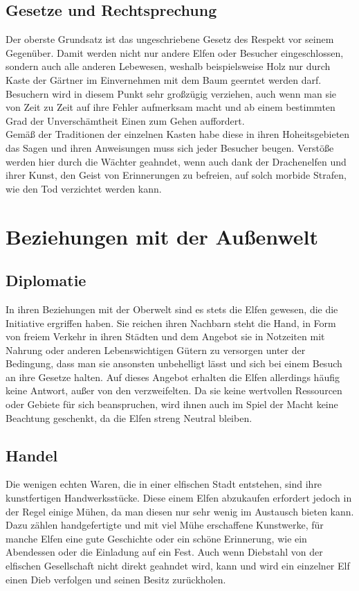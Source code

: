 \documentclass[a4paper,12pt,oneside]{book}
\begin{document}
\chapter{Gesetze und Rechtsprechung}
Der oberste Grundsatz ist das ungeschriebene Gesetz des Respekt vor seinem Gegenüber. Damit werden nicht nur andere Elfen oder Besucher eingeschlossen, sondern auch alle anderen Lebewesen, weshalb beispielsweise Holz nur durch Kaste der Gärtner im Einvernehmen mit dem Baum geerntet werden darf. Besuchern wird in diesem Punkt sehr großzügig verziehen, auch wenn man sie von Zeit zu Zeit auf ihre Fehler aufmerksam macht und ab einem bestimmten Grad der Unverschämtheit Einen zum Gehen auffordert. 
\\Gemäß der Traditionen der einzelnen Kasten habe diese in ihren Hoheitsgebieten das Sagen und ihren Anweisungen muss sich jeder Besucher beugen. Verstöße werden hier durch die Wächter geahndet, wenn auch dank der Drachenelfen und ihrer Kunst, den Geist von Erinnerungen zu befreien, auf solch morbide Strafen, wie den Tod verzichtet werden kann.

\part{Beziehungen mit der Außenwelt}
\chapter{Diplomatie}
In ihren Beziehungen mit der Oberwelt sind es stets die Elfen gewesen, die die Initiative ergriffen haben. Sie reichen ihren Nachbarn steht die Hand, in Form von freiem Verkehr in ihren Städten und dem Angebot sie in Notzeiten mit Nahrung oder anderen Lebenswichtigen Gütern zu versorgen unter der Bedingung, dass man sie ansonsten unbehelligt lässt und sich bei einem Besuch an ihre Gesetze halten. Auf dieses Angebot erhalten die Elfen allerdings häufig keine Antwort, außer von den verzweifelten. Da sie keine wertvollen Ressourcen oder Gebiete für sich beanspruchen, wird ihnen auch im Spiel der Macht keine Beachtung geschenkt, da die Elfen streng Neutral bleiben.
\chapter{Handel}
Die wenigen echten Waren, die in einer elfischen Stadt entstehen, sind ihre kunstfertigen Handwerksstücke. Diese einem Elfen abzukaufen erfordert jedoch in der Regel einige Mühen, da man diesen nur sehr wenig im Austausch bieten kann. Dazu zählen handgefertigte und mit viel Mühe erschaffene Kunstwerke, für manche Elfen eine gute Geschichte oder ein schöne Erinnerung, wie ein Abendessen oder die Einladung auf ein Fest. Auch wenn Diebstahl von der elfischen Gesellschaft nicht direkt geahndet wird, kann und wird ein einzelner Elf einen Dieb verfolgen und seinen Besitz zurückholen. 
\end{document}
